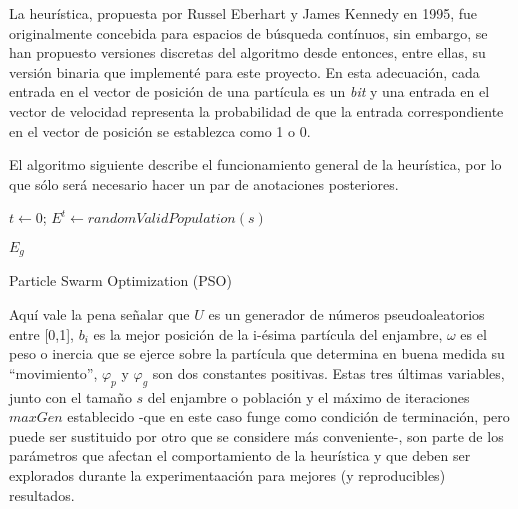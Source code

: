 \documentclass[12pt]{article}
\begin{document}
La heurística, propuesta por Russel Eberhart y James Kennedy en 1995, fue originalmente concebida para espacios de búsqueda contínuos, sin embargo, se han propuesto versiones discretas del algoritmo desde entonces, entre ellas, su versión binaria que implementé para este proyecto. En esta adecuación, cada
entrada en el vector de posición de una partícula es un \textit{bit} y una entrada en el vector
de velocidad representa la probabilidad de que la entrada correspondiente en el vector de posición
se establezca como 1 o 0.

El algoritmo siguiente describe el funcionamiento general de la heurística, por lo que sólo será necesario hacer un par de anotaciones posteriores.

\label{alg:pso}
\begin{algorithm}[H]
  $t \gets 0$;
  $E^t \gets randomValidPopulation(s)$\;
  
  \Return $E_g$

  \caption{Particle Swarm Optimization (PSO)}
\end{algorithm}

Aquí vale la pena señalar que $U$ es un generador de números pseudoaleatorios entre [0,1],
$b_i$ es la mejor posición de la i-ésima partícula del enjambre, $\omega$ es el peso o inercia que
se ejerce sobre la partícula que determina en buena medida su ``movimiento'', $\varphi_p$ y $\varphi_g$ son dos constantes positivas. Estas tres últimas variables, junto con el tamaño $s$ del enjambre o población y el máximo de iteraciones $maxGen$ establecido -que en este caso funge como condición de terminación, pero puede ser sustituido por otro que se considere más conveniente-, son parte de los parámetros que afectan el comportamiento de la heurística y que deben ser explorados durante la experimentaación para mejores (y reproducibles) resultados.
\end{document}
